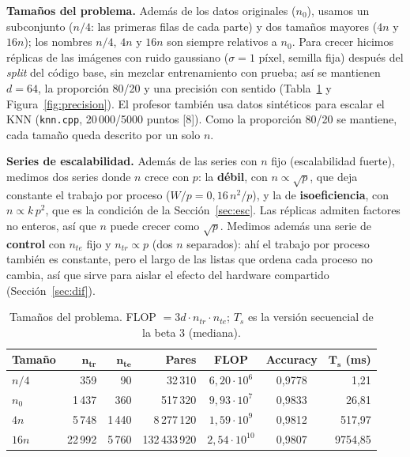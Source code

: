 \documentclass[11pt,a4paper]{article}
\newcommand{\ntr}{n_{tr}}
\newcommand{\nte}{n_{te}}
\begin{document}
\textbf{Tamaños del problema.} Además de los datos originales ($n_0$), usamos un subconjunto ($n/4$: las primeras filas de cada parte) y dos tamaños mayores ($4n$ y $16n$); los nombres $n/4$, $4n$ y $16n$ son siempre relativos a $n_0$. Para crecer hicimos réplicas de las imágenes con ruido gaussiano ($\sigma = 1$ píxel, semilla fija) después del \textit{split} del código base, sin mezclar entrenamiento con prueba; así se mantienen $d = 64$, la proporción 80/20 y una precisión con sentido (Tabla~\ref{tab:tamanos} y Figura~\ref{fig:precision}). El profesor también usa datos sintéticos para escalar el KNN (\texttt{knn.cpp}, 20\,000/5000 puntos [8]). Como la proporción 80/20 se mantiene, cada tamaño queda descrito por un solo $n$.

\textbf{Series de escalabilidad.} Además de las series con $n$ fijo (escalabilidad fuerte), medimos dos series donde $n$ crece con $p$: la \textbf{débil}, con $n \propto \sqrt{p}$, que deja constante el trabajo por proceso ($W/p = 0{,}16\,n^2/p$), y la de \textbf{isoeficiencia}, con $n \propto k\,p^2$, que es la condición de la Sección~\ref{sec:esc}. Las réplicas admiten factores no enteros, así que $n$ puede crecer como $\sqrt{p}$. Medimos además una serie de \textbf{control} con $\nte$ fijo y $\ntr \propto p$ (dos $n$ separados): ahí el trabajo por proceso también es constante, pero el largo de las listas que ordena cada proceso no cambia, así que sirve para aislar el efecto del hardware compartido (Sección~\ref{sec:dif}).

\begin{table}[!htb]
\centering
\small
\begin{tabular}{lrrrccr}
\toprule
\textbf{Tamaño} & $\mathbf{\ntr}$ & $\mathbf{\nte}$ & \textbf{Pares} & \textbf{FLOP} & \textbf{Accuracy} & $\mathbf{T_s}$ \textbf{(ms)} \\
\midrule
$n/4$ & 359 & 90 & 32\,310 & $6{,}20\cdot 10^{6}$ & 0,9778 & 1,21 \\
$n_0$ & 1\,437 & 360 & 517\,320 & $9{,}93\cdot 10^{7}$ & 0,9833 & 26,81 \\
$4n$ & 5\,748 & 1\,440 & 8\,277\,120 & $1{,}59\cdot 10^{9}$ & 0,9812 & 517,97 \\
$16n$ & 22\,992 & 5\,760 & 132\,433\,920 & $2{,}54\cdot 10^{10}$ & 0,9807 & 9754,85 \\
\bottomrule
\end{tabular}
\caption{Tamaños del problema. FLOP $= 3d\cdot\ntr\cdot\nte$; $T_s$ es la versión secuencial de la beta 3 (mediana).}
\label{tab:tamanos}
\end{table}
\end{document}
